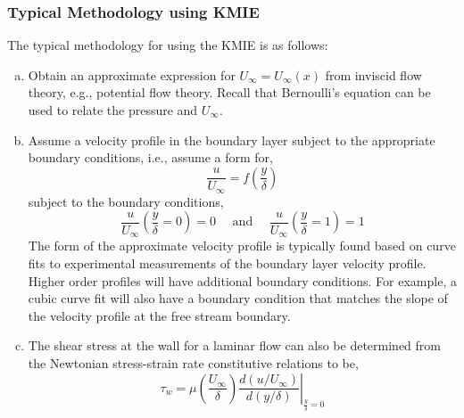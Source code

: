 \subsubsection*{Typical Methodology using KMIE}
The typical methodology for using the KMIE is as follows:
\begin{enumerate}[(a)]
    \item Obtain an approximate expression for $U_\infty=U_\infty(x)$ from inviscid flow theory, e.g., potential flow theory. Recall that Bernoulli's equation can be used to relate the pressure and $U_\infty$.
    \item Assume a velocity profile in the boundary layer subject to the appropriate boundary conditions, i.e., assume a form for,
    $$
    \frac{u}{U_\infty}=f\left(\frac{y}{\delta}\right)
    $$
    subject to the boundary conditions,
    $$
    \frac{u}{U_\infty}\left(\frac{y}{\delta}=0\right)=0 \quad \text { and } \quad \frac{u}{U_\infty}\left(\frac{y}{\delta}=1\right)=1
    $$
    The form of the approximate velocity profile is typically found based on curve fits to experimental measurements of the boundary layer velocity profile. Higher order profiles will have additional boundary conditions. For example, a cubic curve fit will also have a boundary condition that matches the slope of the velocity profile at the free stream boundary.
    \item The shear stress at the wall for a laminar flow can also be determined from the Newtonian stress-strain rate constitutive relations to be,
    $$
    \tau_w=\left.\mu\left(\frac{U_\infty}{\delta}\right) \frac{d(u / U_\infty)}{d(y / \delta)}\right|_{\frac{y}{\delta}=0}
    $$
\end{enumerate}
%



